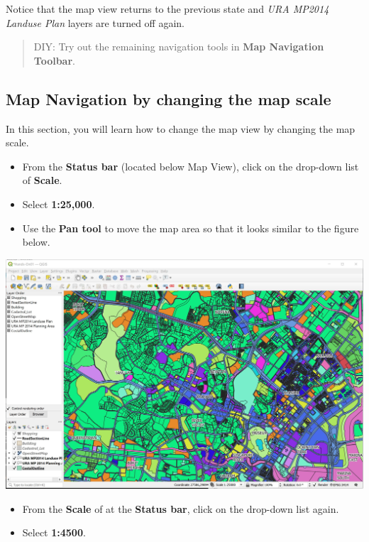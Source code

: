 \documentclass[
  letterpaper,
  DIV=11,
  numbers=noendperiod]{scrreprt}
\providecommand{\tightlist}{%
  \setlength{\itemsep}{0pt}\setlength{\parskip}{0pt}}\usepackage{longtable,booktabs,array}
\begin{document}
Notice that the map view returns to the previous state and \emph{URA
MP2014 Landuse Plan} layers are turned off again.

\begin{quote}
DIY: Try out the remaining navigation tools in \textbf{Map Navigation
Toolbar}.
\end{quote}

\hypertarget{map-navigation-by-changing-the-map-scale}{%
\subsection{Map Navigation by changing the map
scale}\label{map-navigation-by-changing-the-map-scale}}

In this section, you will learn how to change the map view by changing
the map scale.

\begin{itemize}
\tightlist
\item
  From the \textbf{Status bar} (located below Map View), click on the
  drop-down list of \textbf{Scale}.
\item
  Select \textbf{1:25,000}.
\item
  Use the \textbf{Pan tool} to move the map area so that it looks
  similar to the figure below.
\end{itemize}

\includegraphics{./img/image1-16.jpg}

\begin{itemize}
\tightlist
\item
  From the \textbf{Scale} of at the \textbf{Status bar}, click on the
  drop-down list again.
\item
  Select \textbf{1:4500}.
\end{itemize}
\end{document}

